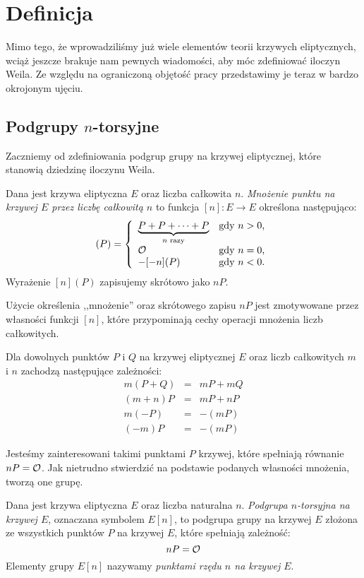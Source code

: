 \section{Definicja}

\noindent
Mimo tego, że wprowadziliśmy już
wiele elementów teorii krzywych eliptycznych,
wciąż jeszcze brakuje nam pewnych wiadomości,
aby móc zdefiniować iloczyn Weila.
Ze względu na ograniczoną objętość pracy
przedstawimy je teraz
w bardzo okrojonym ujęciu.

\subsection*{Podgrupy $n$-torsyjne}

\noindent
Zaczniemy od zdefiniowania podgrup grupy na krzywej eliptycznej,
które stanowią dziedzinę iloczynu Weila.

\begin{definition}
Dana jest krzywa eliptyczna $E$
oraz liczba całkowita $n$.
\emph{Mnożenie punktu na krzywej $E$ przez liczbę całkowitą $n$}
to funkcja $[n] \colon E \to E$
określona następująco:
\begin{equation}
[n](P) =
\fundefthree
{\underbrace{P + P + \cdots + P}_{n\textrm{ razy}}}{n > 0}
{\ecident}{n = 0}
{-[-n](P)}{n < 0}
\end{equation}
Wyrażenie $[n](P)$ zapisujemy skrótowo jako $nP$.
\end{definition}

\noindent
Użycie określenia ,,mnożenie'' oraz skrótowego zapisu $nP$
jest zmotywowane przez własności funkcji $[n]$,
które przypominają cechy operacji mnożenia liczb całkowitych.

\begin{fact}
Dla dowolnych punktów $P$ i $Q$ na krzywej eliptycznej $E$
oraz liczb całkowitych $m$ i $n$
zachodzą następujące zależności:
\begin{eqnarray*}
m(P + Q) & = & mP + mQ \\
(m + n)P & = & mP + nP \\
m(-P) & = & -(mP) \\
(-m)P & = & -(mP)
\end{eqnarray*}
\end{fact}

\noindent
Jesteśmy zainteresowani takimi punktami $P$ krzywej,
które spełniają równanie $nP = \mathcal{O}$.
Jak nietrudno stwierdzić na podstawie podanych własności mnożenia,
tworzą one grupę.

\begin{definition}
Dana jest krzywa eliptyczna $E$
oraz liczba naturalna $n$.
\emph{Podgrupa $n$-torsyjna na krzywej $E$},
oznaczana symbolem $E[n]$,
to podgrupa grupy na krzywej $E$
złożona ze wszystkich punktów $P$ na krzywej $E$,
które spełniają zależność:
\begin{equation}
nP = \mathcal{O}
\end{equation}
Elementy grupy $E[n]$ nazywamy \emph{punktami rzędu $n$ na krzywej $E$}.
\end{definition}

